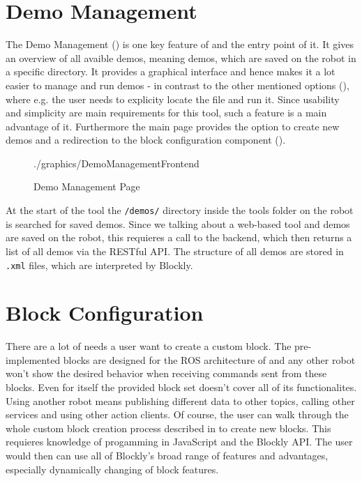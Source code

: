 \section{Demo Management}
The Demo Management () is one key feature of \toolname{} and the entry point of it. It gives an overview of all avaible demos, meaning demos, which are saved on the robot in a specific directory. It provides a graphical interface and hence makes it a lot easier to manage and run demos - in contrast to the other mentioned options (), where e.g. the user needs to explicity locate the file and run it. Since usability and simplicity are main requirements for this tool, such a feature is a main advantage of it. Furthermore the main page provides the option to create new demos and a redirection to the block configuration component ().

\begin{figure}[htbp]
	\centering
	\begin{overpic}[width=\linewidth]{./graphics/DemoManagementFrontend}
	\end{overpic}
	\caption{Demo Management Page}%
	\label{fig:DemoManagement}%
\end{figure}

At the start of the tool the \lstinline!/demos/! directory inside the tools folder on the robot is searched for saved demos. Since we talking about a web-based tool and demos are saved on the robot, this requieres a call to the backend, which then returns a list of all demos via the RESTful API. The structure of all demos are stored in \lstinline!.xml! files, which are interpreted by Blockly.

\section{Block Configuration} \label{sec:BlockConfiguration}
There are a lot of needs a user want to create a custom block. The pre-implemented blocks are designed for the ROS architecture of \hobbit{} and any other robot won't show the desired behavior when receiving commands sent from these blocks. Even for \hobbit{} itself the provided block set doesn't cover all of its functionalites. Using another robot means publishing different data to other topics, calling other services and using other action clients. Of course, the user can walk through the whole custom block creation process described in  to create new blocks. This requieres knowledge of progamming in JavaScript and the Blockly API. The user would then can use all of Blockly's broad range of features and advantages, especially dynamically changing of block features.


